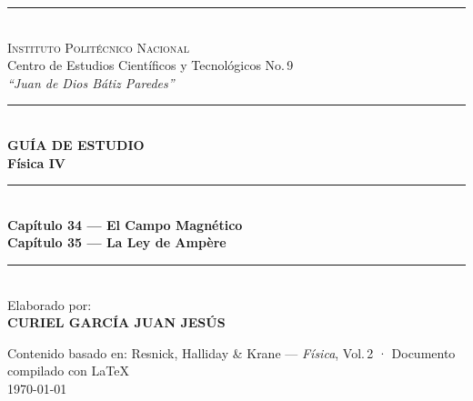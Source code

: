 \documentclass[12pt, letterpaper]{report}
\numberwithin{equation}{section}
\begin{document}

\begin{titlepage}
  \pagecolor{NavyBlue}
  \color{white}
  \centering
  \vspace*{1.8cm}

  {\color{Guinda}\rule{0.55\textwidth}{2.5pt}}\\[0.6cm]

  {\fontsize{13}{16}\selectfont\scshape Instituto Politécnico Nacional}\\[0.25cm]
  {\large Centro de Estudios Científicos y Tecnológicos No.\,9}\\[0.1cm]
  {\normalsize\itshape ``Juan de Dios Bátiz Paredes''}\\[1.2cm]

  {\color{Guinda}\rule{0.55\textwidth}{1.5pt}}\\[1cm]

  {\fontsize{16}{20}\bfseries\selectfont GUÍA DE ESTUDIO}\\[0.4cm]
  {\fontsize{28}{34}\bfseries\selectfont Física IV}\\[0.6cm]

  {\color{Guinda}\rule{0.4\textwidth}{1pt}}\\[0.8cm]

  {\fontsize{18}{22}\bfseries\selectfont
   Capítulo 34 — El Campo Magnético}\\[0.4cm]
  {\fontsize{18}{22}\bfseries\selectfont
   Capítulo 35 — La Ley de Ampère}\\[1.5cm]

  {\color{Guinda}\rule{0.55\textwidth}{1.5pt}}\\[1.2cm]

  {\large Elaborado por:}\\[0.4cm]
  {\Large\bfseries CURIEL GARCÍA JUAN JESÚS}\\[2cm]

  \vfill

  {\small\color{white!65}
   Contenido basado en: Resnick, Halliday \& Krane —
   \textit{Física}, Vol.\,2 ·
   Documento compilado con \LaTeX}\\[0.2cm]
  {\small\color{white!65}\today}
\end{titlepage}

\pagecolor{white}
\color{black}
\end{document}
